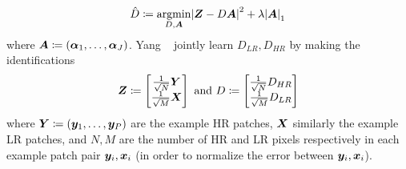 \begin{equation}
	\hat{D} \coloneqq \underset{D, \bm{A}}{\text{argmin}} \abs{ \bm{Z} - D\bm{A} }^2 + \lambda \abs{ \bm{A} }_1
\end{equation}
where \(\bm{A} \coloneqq \left( \bm{\alpha}_1, \mathellipsis, \bm{\alpha}_J  \right)\).
%
Yang \etal~ jointly learn \(D_{LR}, D_{HR}\) by making the identifications
\begin{equation*}
	\bm{Z} \coloneqq \begin{bmatrix}
		\frac{1}{\sqrt{N}}\bm{Y} \\ \frac{1}{\sqrt{M}} \bm{X}
	\end{bmatrix} \text{ and }
	D \coloneqq \begin{bmatrix}
		\frac{1}{\sqrt{N}} D_{HR} \\ \frac{1}{\sqrt{M}} D_{LR}
	\end{bmatrix}
\end{equation*}
where \(\bm{Y} \coloneqq \left( \bm{y}_1, \mathellipsis, \bm{y}_P \right)\) are the example HR patches, \(\bm{X}\) similarly the example LR patches, and \(N, M\) are the number of HR and LR pixels respectively in each example patch pair \(\bm{y}_i, \bm{x}_i\) (in order to normalize the error between \(\bm{y}_i, \bm{x}_i\)).
